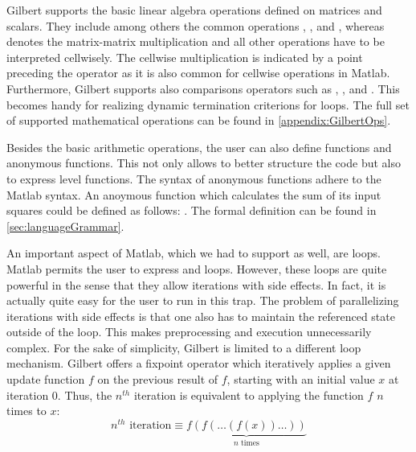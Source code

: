 Gilbert supports the basic linear algebra operations defined on matrices and scalars.
They include among others the common operations \code{+}, \code{-}, \code{/} and \code{*}, whereas \code{*} denotes the matrix-matrix multiplication and all other operations have to be interpreted cellwisely.
The cellwise multiplication is indicated by a point preceding the operator  as it is also common for cellwise operations in Matlab.
Furthermore, Gilbert supports also comparisons operators such as \code{>}, \code{>=}, \code{==} and \code{\textasciitilde=}.
This becomes handy for realizing dynamic termination criterions for loops.
The full set of supported mathematical operations can be found in \cref{appendix:GilbertOps}.

Besides the basic arithmetic operations, the user can also define functions and anonymous functions.
This not only allows to better structure the code but also to express  level functions.
The syntax of anonymous functions adhere to the Matlab syntax.
An anoymous function which calculates the sum of its input squares could be defined as follows: .
The formal definition can be found in \cref{sec:languageGrammar}.

An important aspect of Matlab, which we had to support as well, are loops.
Matlab permits the user to express  and  loops.
However, these loops are quite powerful in the sense that they allow iterations with side effects.
In fact, it is actually quite easy for the user to run in this trap.
The problem of parallelizing iterations with side effects is that one also has to maintain the referenced state outside of the loop.
This makes preprocessing and execution unnecessarily complex.
For the sake of simplicity, Gilbert is limited to a different loop mechanism.
Gilbert offers a fixpoint operator  which iteratively applies a given update function $f$ on the previous result of $f$, starting with an initial value $x$ at iteration $0$.
Thus, the $n^{th}$ iteration is equivalent to applying the function $f$ $n$ times to $x$: 
\begin{displaymath}
	n^{th}\text{ iteration}\equiv\underbrace{f(f(\ldots(f(x))\ldots))}_{\text{$n$ times}}
\end{displaymath}

